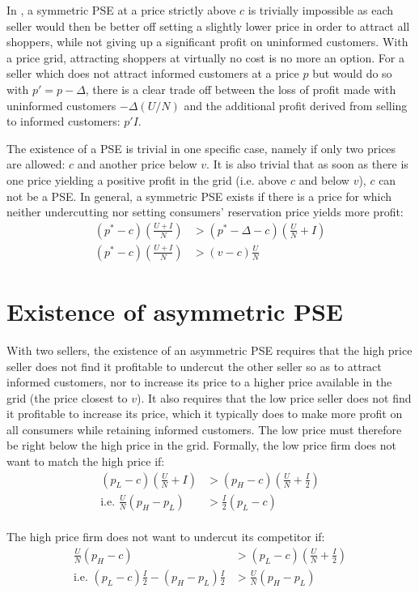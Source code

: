 \documentclass[11pt]{article}
\begin{document}
In \cite{VAR80}, a symmetric PSE at a price strictly above $c$ is trivially impossible as each seller would then be better off setting a slightly lower price in order to attract all shoppers, while not giving up a significant profit on uninformed customers. With a price grid, attracting shoppers at virtually no cost is no more an option. For a seller which does not attract informed customers at a price $p$ but would do so with $p'=p-\Delta$, there is a clear trade off between the loss of profit made with uninformed customers $-\Delta(U/N)$ and the additional profit derived from selling to informed customers: $p' I$.

The existence of a PSE is trivial in one specific case, namely if only two prices are allowed: $c$ and another price below $v$. It is also trivial that as soon as there is one price yielding a positive profit in the grid (i.e. above $c$ and below $v$), $c$ can not be a PSE. In general, a symmetric PSE exists if there is a price for which neither undercutting nor setting consumers' reservation price yields more profit:
\begin{align*}
(p^* - c)(\frac{U + I}{N}) & > (p^{*} -\Delta - c)(\frac{U}{N} + I) \\
(p^* - c)(\frac{U + I}{N}) & > (v-c) \frac{U}{N}
\end{align*}

\section{Existence of asymmetric PSE}

With two sellers, the existence of an asymmetric PSE requires that the high price seller does not find it profitable to undercut the other seller so as to attract informed customers, nor to increase its price to a higher price available in the grid (the price closest to $v$). It also requires that the low price seller does not find it profitable to increase its price, which it typically does to make more profit on all consumers while retaining informed customers. The low price must therefore be right below the high price in the grid. Formally, the low price firm does not want to match the high price if:
\begin{align*}
(p_L - c) \left( \frac{U}{N} + I \right) & > (p_H - c) \left( \frac{U}{N} + \frac{I}{2} \right) \\
\text{i.e. } \frac{U}{N} \left( p_H - p_L \right) & > \frac{I}{2} \left( p_L - c \right)
\end{align*}
\ \\
The high price firm does not want to undercut its competitor if:
\begin{align*}
\frac{U}{N}  (p_H - c) & > (p_L - c)(\frac{U}{N} + \frac{I}{2}) \\
\text{i.e. } (p_L - c) \frac{I}{2} - (p_H - p_L) \frac{I}{2} & > \frac{U}{N} (p_H - p_L)
\end{align*}
\end{document}
